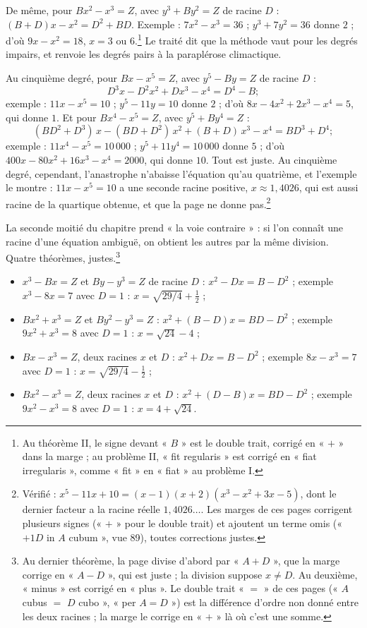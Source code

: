 \documentclass[11pt,a4paper]{article}
\begin{document}
De même, pour $Bx^2 - x^3 = Z$, avec $y^3 + By^2 = Z$ de racine $D$ :
$(B + D)x - x^2 = D^2 + BD$. Exemple : $7x^2 - x^3 = 36$ ; $y^3 + 7y^2 = 36$ donne
$2$ ; d'où $9x - x^2 = 18$, $x = 3$ ou $6$.\footnote{Au théorème II, le signe
devant « $B$ » est le double trait, corrigé en « $+$ » dans la marge ; au
problème II, « fit regularis » est corrigé en « fiat irregularis », comme
« fit » en « fiat » au problème I.} Le traité dit que la méthode vaut pour les
degrés impairs, et renvoie les degrés pairs à la paraplérose climactique.

Au cinquième degré, pour $Bx - x^5 = Z$, avec $y^5 - By = Z$ de racine $D$ :
\[ D^3x - D^2x^2 + Dx^3 - x^4 = D^4 - B ; \]
exemple : $11x - x^5 = 10$ ; $y^5 - 11y = 10$ donne $2$ ; d'où
$8x - 4x^2 + 2x^3 - x^4 = 5$, qui donne $1$. Et pour $Bx^4 - x^5 = Z$, avec
$y^5 + By^4 = Z$ :
\[ (BD^2 + D^3)\,x - (BD + D^2)\,x^2 + (B + D)\,x^3 - x^4 = BD^3 + D^4 ; \]
exemple : $11x^4 - x^5 = 10\,000$ ; $y^5 + 11y^4 = 10\,000$ donne $5$ ; d'où
$400x - 80x^2 + 16x^3 - x^4 = 2000$, qui donne $10$. Tout est juste. Au cinquième
degré, cependant, l'anastrophe n'abaisse l'équation qu'au quatrième, et
l'exemple le montre : $11x - x^5 = 10$ a une seconde racine positive,
$x \approx 1{,}4026$, qui est aussi racine de la quartique obtenue, et que la
page ne donne pas.\footnote{Vérifié : $x^5 - 11x + 10 = (x - 1)(x + 2)(x^3 - x^2 +
3x - 5)$, dont le dernier facteur a la racine réelle $1{,}4026\ldots$. Les
marges de ces pages corrigent plusieurs signes (« $+$ » pour le double trait) et
ajoutent un terme omis (« $+ 1D$ in $A$ cubum », vue 89), toutes corrections justes.}

La seconde moitié du chapitre prend « la voie contraire » : si l'on connaît une
racine d'une équation ambiguë, on obtient les autres par la même division. Quatre
théorèmes, justes.\footnote{Au dernier théorème, la page divise d'abord par
« $A + D$ », que la marge corrige en « $A - D$ », qui est juste ; la division
suppose $x \ne D$. Au deuxième, « minus » est corrigé en « plus ». Le double
trait « $=$ » de ces pages (« $A$ cubus $=$ $D$ cubo », « per $A = D$ ») est la
différence d'ordre non donné entre les deux racines ; la marge le corrige en
« $+$ » là où c'est une somme.}
\begin{itemize}
  \item $x^3 - Bx = Z$ et $By - y^3 = Z$ de racine $D$ : $x^2 - Dx = B - D^2$ ;
    exemple $x^3 - 8x = 7$ avec $D = 1$ : $x = \sqrt{29/4} + \tfrac12$ ;
  \item $Bx^2 + x^3 = Z$ et $By^2 - y^3 = Z$ : $x^2 + (B - D)x = BD - D^2$ ;
    exemple $9x^2 + x^3 = 8$ avec $D = 1$ : $x = \sqrt{24} - 4$ ;
  \item $Bx - x^3 = Z$, deux racines $x$ et $D$ : $x^2 + Dx = B - D^2$ ; exemple
    $8x - x^3 = 7$ avec $D = 1$ : $x = \sqrt{29/4} - \tfrac12$ ;
  \item $Bx^2 - x^3 = Z$, deux racines $x$ et $D$ : $x^2 + (D - B)x = BD - D^2$ ;
    exemple $9x^2 - x^3 = 8$ avec $D = 1$ : $x = 4 + \sqrt{24}$.
\end{itemize}
\end{document}
